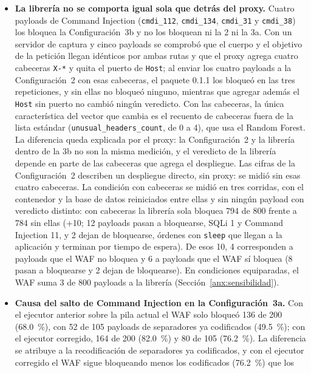 \begin{itemize}
    La atribución al WAF coincide, categoría por categoría, con lo medido por separado en la 3a,
    pero no es un cruce determinista.
    \item \textbf{La librería no se comporta igual sola que detrás del proxy.} Cuatro payloads de
    Command Injection (\texttt{cmdi\_112}, \texttt{cmdi\_134}, \texttt{cmdi\_31} y
    \texttt{cmdi\_38}) los bloquea la Configuración~3b y no los bloquean ni la 2 ni la 3a. Con
    un servidor de captura y cinco payloads se comprobó que el cuerpo y el objetivo de la petición
    llegan idénticos por ambas rutas y que el proxy agrega cuatro cabeceras \texttt{X-*} y quita el
    puerto de \texttt{Host}; al
    enviar los cuatro payloads a la Configuración~2 con esas cabeceras, el paquete 0.1.1 los
    bloqueó en las tres repeticiones, y sin ellas no bloqueó ninguno, mientras que agregar además
    el \texttt{Host} sin puerto no cambió ningún veredicto. Con las cabeceras, la única
    característica del vector que cambia es el recuento de cabeceras fuera de la lista estándar
    (\texttt{unusual\_headers\_count}, de 0 a 4), que usa el Random Forest. La diferencia queda
    explicada por el proxy: la Configuración~2 y la librería dentro de la 3b no son la misma
    medición, y el veredicto de la librería depende en parte de las cabeceras que agrega el
    despliegue. Las cifras de la Configuración~2 describen un despliegue directo, sin proxy: se
    midió sin esas cuatro cabeceras. La condición con cabeceras se midió en tres corridas, con el
    contenedor y la base de datos reiniciados entre ellas y sin ningún payload con veredicto
    distinto: con cabeceras la librería sola bloquea 794 de 800 frente a 784 sin ellas (+10; 12
    payloads pasan a bloquearse, SQLi 1 y Command Injection 11, y 2 dejan de bloquearse, órdenes con
    \texttt{sleep} que llegan a la aplicación y terminan por tiempo de espera). De esos 10, 4
    corresponden a payloads que el WAF no bloquea y 6 a payloads que el WAF sí bloquea (8 pasan a
    bloquearse y 2 dejan de bloquearse). En condiciones equiparadas, el WAF suma 3 de 800 payloads a
    la librería (Sección~\ref{anx:sensibilidad}).
    \item \textbf{Causa del salto de Command Injection en la Configuración~3a.} Con el ejecutor
    anterior sobre la pila actual el WAF solo bloqueó 136 de 200 (68.0~\%), con 52 de 105 payloads
    de separadores ya codificados (49.5~\%); con el ejecutor corregido, 164 de 200 (82.0~\%) y 80 de
    105 (76.2~\%). La diferencia se atribuye a la recodificación de separadores ya codificados, y
    con el ejecutor corregido el WAF sigue bloqueando menos los codificados (76.2~\%) que los

\end{itemize}
